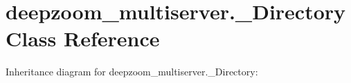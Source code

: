 \hypertarget{classdeepzoom__multiserver_1_1__Directory}{}\section{deepzoom\+\_\+multiserver.\+\_\+\+Directory Class Reference}
\label{classdeepzoom__multiserver_1_1__Directory}


Inheritance diagram for deepzoom\+\_\+multiserver.\+\_\+\+Directory\+:
